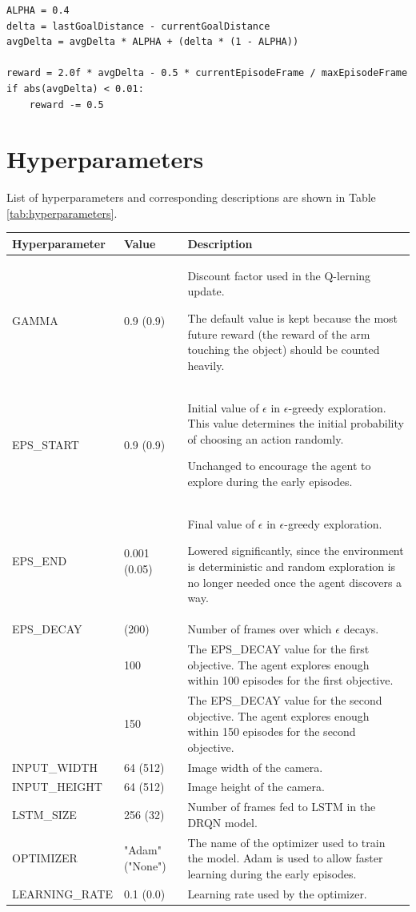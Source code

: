 \documentclass[a4paper]{article}
\begin{document}
\begin{verbatim}
ALPHA = 0.4
delta = lastGoalDistance - currentGoalDistance
avgDelta = avgDelta * ALPHA + (delta * (1 - ALPHA))

reward = 2.0f * avgDelta - 0.5 * currentEpisodeFrame / maxEpisodeFrame
if abs(avgDelta) < 0.01:
	reward -= 0.5
\end{verbatim}

\section{Hyperparameters}
List of hyperparameters and corresponding descriptions are shown in Table \ref{tab:hyperparameters}.

\begin{table}[htp]
\centering
\begin{tabular}{p{3.5cm}|p{1.5cm}|p{8.5cm}}
Hyperparameter & Value & Description \\
\hline
GAMMA & 0.9 (0.9) & Discount factor used in the Q-lerning \cite{Watkins92q-learning} update.

The default value is kept because the most future reward (the reward of the arm touching the object) should be counted heavily. \\
EPS\_START & 0.9 (0.9) & Initial value of \(\epsilon\) in \(\epsilon\)-greedy exploration. This value determines the initial probability of choosing an action randomly.

Unchanged to encourage the agent to explore during the early episodes. \\
EPS\_END & 0.001 (0.05) & Final value of \(\epsilon\) in \(\epsilon\)-greedy exploration.

Lowered significantly, since the environment is deterministic and random exploration is no longer needed once the agent discovers a way. \\
EPS\_DECAY & (200) & Number of frames over which  \(\epsilon\) decays. \\
 & 100 & The EPS\_DECAY value for the first objective. The agent explores enough within 100 episodes for the first objective. \\
 & 150 & The EPS\_DECAY value for the second objective.  The agent explores enough within 150 episodes for the second objective. \\
INPUT\_WIDTH & 64 (512) & Image width of the camera. \\
INPUT\_HEIGHT & 64 (512) & Image height of the camera. \\
LSTM\_SIZE & 256 (32) & Number of frames fed to LSTM \cite{Hochreiter:1997:LSM:1246443.1246450} in the DRQN model. \\
OPTIMIZER & "Adam" ("None") & The name of the optimizer used to train the model. Adam \cite{DBLP:journals/corr/KingmaB14} is used to allow faster learning during the early episodes. \\
LEARNING\_RATE & 0.1 (0.0) & Learning rate used by the optimizer.


\end{tabular}
\end{table}
\end{document}
